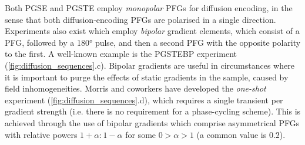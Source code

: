 Both \ac{PGSE} and \ac{PGSTE} employ \emph{monopolar} \acp{PFG} for diffusion
encoding, in the sense that both diffusion-encoding \acp{PFG} are polarised in a
single direction. Experiments also exist which employ
\emph{bipolar} gradient elements\cite{Cotts1989,Wu1995}, which consist of a
\ac{PFG}, followed by a \ang{180} pulse, and then a second \ac{PFG} with the
opposite polarity to the first. A well-known example is the \ac{PGSTEBP}
experiment (\cref{fig:diffusion_sequences}.c). Bipolar gradients are
useful in circumstances where it is important to purge the effects of static
gradients in the sample, caused by field inhomogeneities. Morris and coworkers
have developed the \emph{one-shot} experiment\cite{Pelta2002}
(\cref{fig:diffusion_sequences}.d), which requires a single transient per
gradient strength (i.e. there is no requirement for a phase-cycling scheme).
This is achieved through the use of bipolar gradients which comprise
asymmetrical \acp{PFG} with relative powers $1 + \alpha : 1 - \alpha$ for some
$ 0 > \alpha > 1$ (a common value is $0.2$).

